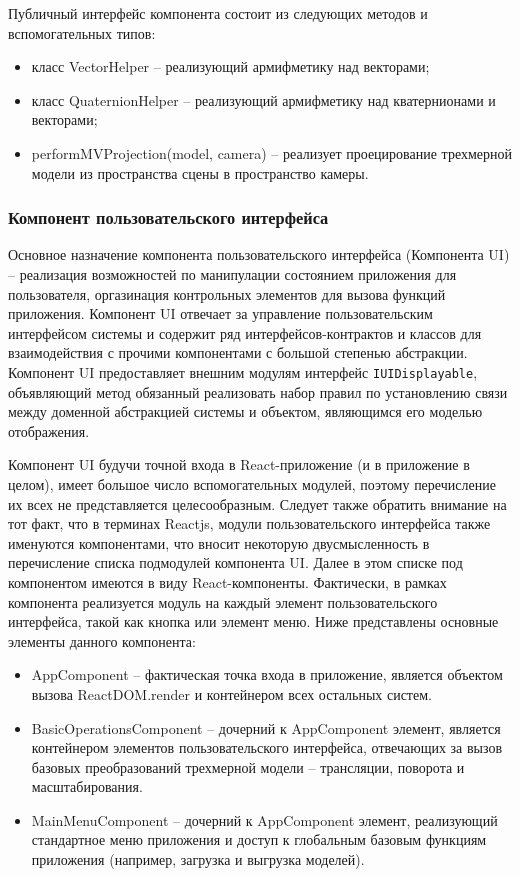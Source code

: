 Публичный интерфейс компонента состоит из следующих методов и вспомогательных типов:
\begin{itemize}
\item класс VectorHelper -- реализующий армифметику над векторами;
\item класс QuaternionHelper -- реализующий армифметику над кватернионами и векторами;
\item performMVProjection(model, camera) -- реализует проецирование трехмерной модели из пространства сцены в пространство камеры.
\end{itemize}

\subsubsection{Компонент пользовательского интерфейса}
\label{sub:theory:components:ui}

Основное назначение компонента пользовательского интерфейса (Компонента UI) -- реализация возможностей по манипулации состоянием приложения для пользователя, оргазинация
контрольных элементов для вызова функций приложения.
Компонент UI отвечает за управление пользовательским интерфейсом системы и содержит ряд интерфейсов-контрактов и классов для взаимодействия с прочими компонентами
с большой степенью абстракции. Компонент UI предоставляет внешним модулям интерфейс \texttt{IUIDisplayable}, объявляющий метод обязанный реализовать набор правил
по установлению связи между доменной абстракцией системы и объектом, являющимся его моделью отображения.

Компонент UI будучи точной входа в React-приложение (и в приложение в целом), имеет большое число вспомогательных модулей, поэтому перечисление их всех не представляется целесообразным.
Следует также обратить внимание на тот факт, что в терминах Reactjs, модули пользовательского интерфейса также именуются компонентами, что вносит некоторую двусмысленность в перечисление списка
подмодулей компонента UI. Далее в этом списке под компонентом имеются в виду React-компоненты. Фактически, в рамках компонента реализуется модуль на каждый элемент пользовательского 
интерфейса, такой как кнопка или элемент меню. Ниже представлены основные элементы данного компонента:

\begin{itemize}
\item AppComponent -- фактическая точка входа в приложение, является объектом вызова ReactDOM.render и контейнером всех остальных систем.
\item BasicOperationsComponent -- дочерний к AppComponent элемент, является контейнером элементов пользовательского интерфейса, отвечающих за вызов базовых преобразований трехмерной
модели -- трансляции, поворота и масштабирования.
\item MainMenuComponent -- дочерний к AppComponent элемент, реализующий стандартное меню приложения и доступ к глобальным базовым функциям приложения (например, загрузка и выгрузка моделей).
\end{itemize}

